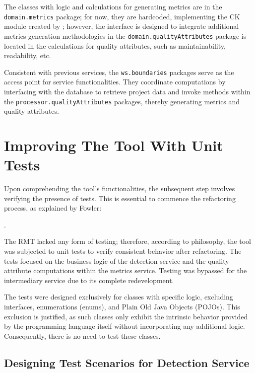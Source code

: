 The classes with logic and calculations for generating metrics are in the \texttt{domain.metrics} package; for now, they are hardcoded, implementing the CK module created by \textcite{ck}; however, the interface is designed to integrate additional metrics generation methodologies in the \texttt{domain.qualityAttributes} package is located in the calculations for quality attributes, such as maintainability, readability, etc.

Consistent with previous services, the \texttt{ws.boundaries} packages serve as the access point for service functionalities. They coordinate computations by interfacing with the database to retrieve project data and invoke methods within the \texttt{processor.qualityAttributes} packages, thereby generating metrics and quality attributes.
 
\section{Improving The Tool With Unit Tests}

Upon comprehending the tool's functionalities, the subsequent step involves verifying the presence of tests. This is essential to commence the refactoring process, as explained by Fowler:

.

The RMT lacked any form of testing; therefore, according to \textcite{fowler2018refactoring} philosophy, the tool was subjected to unit tests to verify consistent behavior after refactoring. The tests focused on the business logic of the detection service and the quality attribute computations within the metrics service. Testing was bypassed for the intermediary service due to its complete redevelopment.

The tests were designed exclusively for classes with specific logic, excluding interfaces, enumerations (enums), and Plain Old Java Objects (POJOs). This exclusion is justified, as such classes only exhibit the intrinsic behavior provided by the programming language itself without incorporating any additional logic. Consequently, there is no need to test these classes.

\subsection{Designing Test Scenarios for Detection Service}

